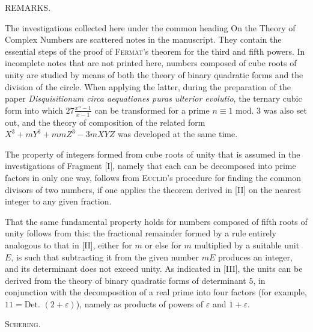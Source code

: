 \clearpage
{}%
\begin{center}REMARKS.\end{center}
The investigations collected here under the common heading On the Theory of Complex Numbers are scattered notes in the manuscript. They contain the essential steps of the proof of \textsc{Fermat}'s theorem for the third and fifth powers. In incomplete notes that are not printed here, numbers composed of cube roots of unity are studied by means of both the theory of binary quadratic forms and the division of the circle. When applying the latter, during the preparation of the paper \emph{Disquisitionum circa aequationes puras ulterior evolutio}, the ternary cubic form into which $27\frac{x^n-1}{x-1}$ can be transformed for a prime $n\equiv1\text{ mod. }3$ was also set out, and the theory of composition of the related form $X^3+mY^3+mmZ^3-3mXYZ$ was developed at the same time.

The property of integers formed from cube roots of unity that is assumed in the investigations of Fragment [I], namely that each can be decomposed into prime factors in only one way, follows from \textsc{Euclid}'s procedure for finding the common divisors of two numbers, if one applies the theorem derived in [II] on the nearest integer to any given fraction.

That the same fundamental property holds for numbers composed of fifth roots of unity follows from this: the fractional remainder formed by a rule entirely analogous to that in [II], either for $m$ or else for $m$ multiplied by a suitable unit $E$, is such that subtracting it from the given number $mE$ produces an integer, and its determinant does not exceed unity. As indicated in [III], the units can be derived from the theory of binary quadratic forms of determinant $5$, in conjunction with the decomposition of a real prime into four factors (for example, $11=\text{Det. }(2+\varepsilon)$), namely as products of powers of $\varepsilon$ and $1+\varepsilon$.
\begin{flushright}\textsc{Schering.}\end{flushright}
